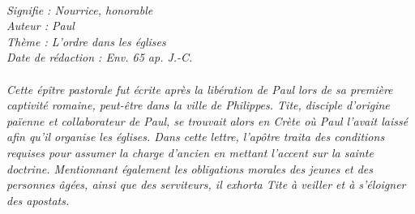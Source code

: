 \BFont
\noindent\hrulefill
{\footnotesize
\textit{
\bigskip
{\centering{}
\\Signifie : Nourrice, honorable
\\Auteur : Paul
\\Thème : L'ordre dans les églises
\\Date de rédaction : Env. 65 ap. J.-C.\\}
}
\textit{
\\Cette épître pastorale fut écrite après la libération de Paul lors de sa première captivité romaine, peut-être dans la ville de Philippes. Tite, disciple d’origine païenne et collaborateur de Paul, se trouvait alors en Crète où Paul l’avait laissé afin qu’il organise les églises. Dans cette lettre, l’apôtre traita des conditions requises pour assumer la charge d’ancien en mettant l’accent sur la sainte doctrine. Mentionnant également les obligations morales des jeunes et des personnes âgées, ainsi que des serviteurs, il exhorta Tite à veiller et à s’éloigner des apostats.\bigskip
}
}
\par\nobreak\noindent\hrulefill
